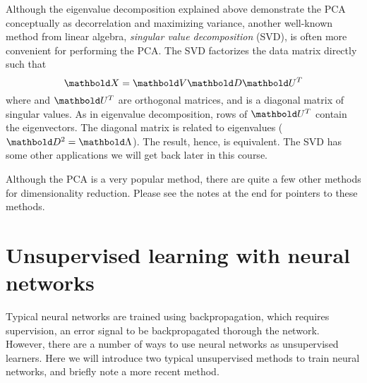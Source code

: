 Although the eigenvalue decomposition explained above demonstrate
the PCA conceptually as decorrelation and maximizing variance,
another well-known method from linear algebra,
\emph{singular value decomposition} (SVD),
is often more convenient for performing the PCA.
The SVD factorizes the data matrix  directly such that
\[
  \vect{X} = \vect{V} \vect{D} \vect{U}^{T}
\]
where  and $\vect{U}^{T}$ are orthogonal matrices,
and  is a diagonal matrix of singular values.
As in eigenvalue decomposition,
rows of $\vect{U}^{T}$ contain the eigenvectors.
The diagonal matrix  is related to eigenvalues
($\vect{D}^{2} = \vect{\Lambda}$).
The result, hence, is equivalent.
The SVD has some other applications we will get back later in this course.


Although the PCA is a very popular method,
there are quite a few other methods for dimensionality reduction.
Please see the notes at the end for pointers to these methods. %

\section{Unsupervised learning with neural networks}

Typical neural networks are trained using backpropagation,
which requires supervision, an error signal
to be backpropagated thorough the network.
However, there are a number of ways to use neural networks
as unsupervised learners.
Here we will introduce two typical unsupervised methods
to train neural networks,
and briefly note a more recent method.

